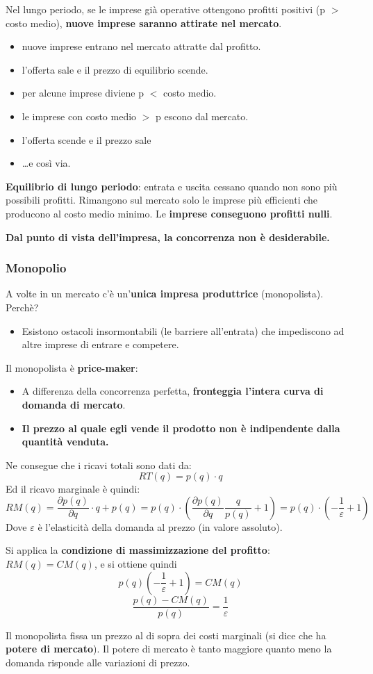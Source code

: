\documentclass[../main.tex]{subfiles}
\begin{document}
Nel lungo periodo, se le imprese già operative ottengono profitti positivi (p $>$ costo medio), \textbf{nuove imprese saranno attirate nel mercato}.

\begin{itemize}
    \item nuove imprese entrano nel mercato attratte dal profitto.
    \item l'offerta sale e il prezzo di equilibrio scende.
    \item per alcune imprese diviene p $<$ costo medio.
    \item le imprese con costo medio $>$ p escono dal mercato.
    \item l'offerta scende e il prezzo sale
    \item \dots e così via.
\end{itemize}

\textbf{Equilibrio di lungo periodo}: entrata e uscita cessano quando non sono più possibili profitti. Rimangono sul mercato solo le imprese più efficienti che producono al costo medio minimo. Le \textbf{imprese conseguono profitti nulli}.

\textbf{Dal punto di vista dell'impresa, la concorrenza non è desiderabile.}

\subsubsection{Monopolio}

A volte in un mercato c'è un'\textbf{unica impresa produttrice} (monopolista). Perchè?
\begin{itemize}
    \item Esistono ostacoli insormontabili (le barriere all'entrata) che impediscono ad altre imprese di entrare e competere.
\end{itemize}

Il monopolista è \textbf{price-maker}:
\begin{itemize}
    \item A differenza della concorrenza perfetta, \textbf{fronteggia l'intera curva di domanda di mercato}.
    \item \textbf{Il prezzo al quale egli vende il prodotto non è indipendente dalla quantità venduta.}
\end{itemize}

Ne consegue che i ricavi totali sono dati da:
$$RT(q) = p(q)\cdot q$$
Ed il ricavo marginale è quindi:
$$
RM(q)=\frac{\partial p(q)}{\partial q}\cdot q + p(q) = p(q)\cdot \left(\frac{\partial p(q)}{\partial q}\frac{q}{p(q)}+1\right)=p(q)\cdot \left(-\frac{1}{\varepsilon}+1\right)
$$
Dove $\varepsilon$ è l'elasticità della domanda al prezzo (in valore assoluto).

Si applica la \textbf{condizione di massimizzazione del profitto}: $RM(q) = CM(q)$, e si ottiene quindi
$$p(q) \left(-\frac{1}{\varepsilon}+1\right)=CM(q)$$
$$\frac{p(q)-CM(q)}{p(q)} = \frac{1}{\varepsilon}$$

Il monopolista fissa un prezzo al di sopra dei costi marginali (si dice che ha \textbf{potere di mercato}). Il potere di mercato è tanto maggiore quanto meno la domanda risponde alle variazioni di prezzo.
\end{document}
